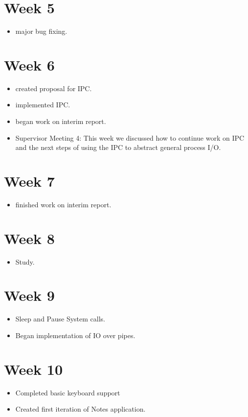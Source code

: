 \documentclass[a4paper]{report}
\begin{document}
\section*{Week 5}
\begin{itemize}
\item major bug fixing.
\end{itemize}

\section*{Week 6}
\begin{itemize}
\item created proposal for IPC.
\item implemented IPC.
\item began work on interim report.
\item Supervisor Meeting 4: This week we discussed how to continue work on IPC and the next steps of using the IPC to abstract general process I/O.
\end{itemize}

\section*{Week 7}
\begin{itemize}
\item finished work on interim report.
\end{itemize}

\section*{Week 8}
\begin{itemize}
\item Study.
\end{itemize}

\section*{Week 9}
\begin{itemize}
\item Sleep and Pause System calls.
\item Began implementation of IO over pipes.
\end{itemize}

\section*{Week 10}
\begin{itemize}
\item Completed basic keyboard support
\item Created first iteration of Notes application.
\end{itemize}
\end{document}
